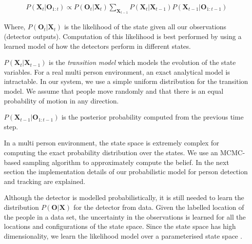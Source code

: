 
\begin{align}
P(\textbf{X}_{t} | \textbf{O}_{1:t}) \propto   P(\textbf{O}_{t} | \textbf{X}_{t}) \sum\limits_{\textbf{X}_{t-1}} P(\textbf{X}_{t}|\textbf{X}_{t-1}) P(\textbf{X}_{t-1}|\textbf{O}_{1:t-1}) \end{align} 




Where, $P(\textbf{O}_{t} | \textbf{X}_{t})$ is the likelihood of the state given all our observations (detector outputs). Computation of this likelihood is best performed by using a learned model of how the detectors perform in different states.

$P(\textbf{X}_{t}|\textbf{X}_{t-1})$ is the \textit{transition model} which models the evolution of the state variables. For a real multi person environment, an exact analytical model is intractable. In our system, we use a simple uniform distribution for the transition model. We assume that people move randomly and that there is an equal probability of motion in any direction. 

$P(\textbf{X}_{t-1}|\textbf{O}_{1:t-1})$ is the posterior probability computed from the previous time step.

In a multi person environment, the state space is extremely complex for computing the exact probability 
distribution over the states. We use an MCMC-based sampling algorithm to approximately compute the belief. In the next section the implementation details of our probabilistic model for person detection and tracking are explained.


Although the detector is modelled probabilistically, it is still needed to learn the distribution $P(\textbf{O}|\textbf{X})$ for the detector from data. Given the labelled location of the people in a data set, the uncertainty in the observations is learned for all the locations and configurations of the state space. Since the state space has high dimensionality, we learn the likelihood model over a parameterised state space \cite{berclaz-fleuret-fua-2008}.



